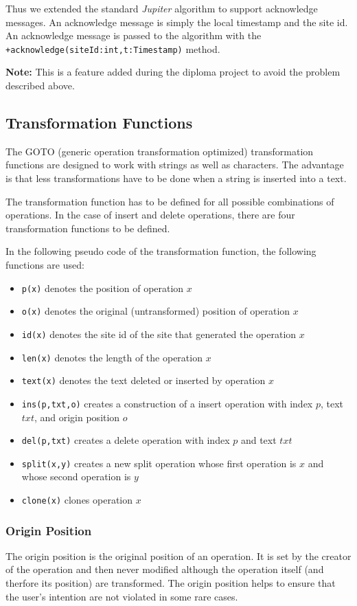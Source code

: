 Thus we extended the standard \emph{Jupiter} algorithm to support acknowledge
messages. An acknowledge message is simply the local timestamp and the site
id. An acknowledge message is passed to the algorithm with the
\texttt{+acknowledge(siteId:int,t:Timestamp)} method.

\textbf{Note:} This is a feature added during the diploma project to
avoid the problem described above.




\subsection{Transformation Functions}
The GOTO (generic operation transformation optimized) transformation functions 
are designed to work with strings as well as characters. The advantage is that 
less transformations have to be done when a string is inserted into a text. 

The transformation function has to be defined for all possible combinations
of operations. In the case of insert and delete operations, there are four
transformation functions to be defined.

In the following pseudo code of the transformation function, the following
functions are used:
\begin{itemize}
 \item \texttt{p(x)} denotes the position of operation $x$
 \item \texttt{o(x)} denotes the original (untransformed) position of operation $x$
 \item \texttt{id(x)} denotes the site id of the site that generated the operation $x$
 \item \texttt{len(x)} denotes the length of the operation $x$
 \item \texttt{text(x)} denotes the text deleted or inserted by operation $x$
 \item \texttt{ins(p,txt,o)} creates a construction of a insert operation with index $p$, text $txt$, and origin position $o$
 \item \texttt{del(p,txt)} creates a delete operation with index $p$ and text $txt$
 \item \texttt{split(x,y)} creates a new split operation whose first operation is $x$ and whose second operation is $y$
 \item \texttt{clone(x)} clones operation $x$
\end{itemize}


\subsubsection{Origin Position}
The origin position is the original position of an operation. It is set by
the creator of the operation and then never modified although the operation
itself (and therfore its position) are transformed. The origin position 
helps to ensure that the user's intention are not violated in some rare
cases.

